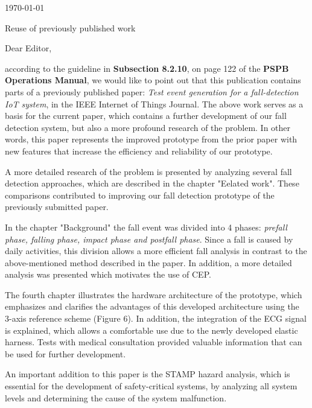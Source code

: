 \documentclass[parskip]{scrartcl}
\begin{document}
 
\pagestyle{empty}

\begin{flushright}
    \Large
    \today
\end{flushright}

\begin{center}
    \huge
    Reuse of previously published work \\
    \vspace{0.4cm}

\end{center}
 
    \vspace{0.8cm}

    \normalsize

Dear Editor,

according to the guideline in \textbf{Subsection 8.2.10}, on page 122 of the \textbf{PSPB Operations Manual}, we would like to point out that this publication contains parts of a previously published paper: \textit{Test event generation for a fall-detection IoT system}, in the IEEE Internet of Things Journal. The above work serves as a basis for the current paper, which contains a further development of our fall detection system, but also a more profound research of the problem. In other words, this paper represents the improved prototype from the prior paper with new features that increase the efficiency and reliability of our prototype.

A more detailed research of the problem is presented by analyzing several fall detection approaches, which are described in the chapter "Eelated work". These comparisons contributed to improving our fall detection prototype of the previously submitted paper. 

In the chapter "Background" the fall event was divided into 4 phases: \textit{prefall phase, falling phase, impact phase and postfall phase}. Since a fall is caused by daily activities, this division allows a more efficient fall analysis in contrast to the above-mentioned method described in the paper.
In addition, a more detailed analysis was presented which motivates the use of CEP. 

The fourth chapter illustrates the hardware architecture of the prototype, which emphasizes and clarifies the advantages of this developed architecture using the 3-axis reference scheme (Figure 6). In addition, the integration of the ECG signal is explained, which allows a comfortable use due to the newly developed elastic harness. Tests with medical consultation provided valuable information that can be used for further development. 

An important addition to this paper is the STAMP hazard analysis, which is essential for the development of safety-critical systems, by analyzing all system levels and determining the cause of the system malfunction.
\end{document}
